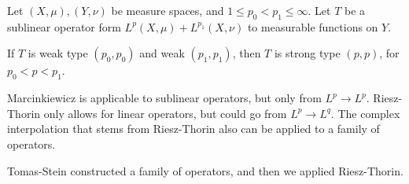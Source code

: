 \begin{theorem}
    Let $(X,\mu), (Y,\nu)$ be measure spaces, and $1\leq p_0<p_1\leq\infty$. Let $T$ be a sublinear operator form $L^p(X,\mu)+ L^{p_1}(X,\nu)$ to measurable functions on $Y$.

    If $T$ is weak type $(p_0, p_0)$ and weak $(p_1, p_1)$, then $T$ is strong type $(p,p)$, for $p_0<p<p_1$.
\end{theorem}
\begin{remark}
    Marcinkiewicz is applicable to sublinear operators, but only from $L^p\to L^p$. Riesz-Thorin only allows for linear operators, but could go from $L^p\to L^q$. The complex interpolation that stems from Riesz-Thorin also can be applied to a family of operators.
\end{remark}
\begin{remark}
    Tomas-Stein constructed a family of operators, and then we applied Riesz-Thorin.
\end{remark}
